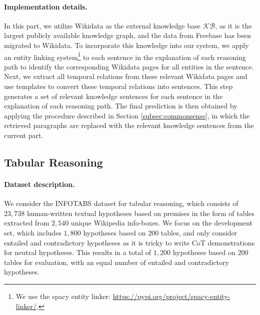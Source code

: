 \paragraph{Implementation details.} In this part, we utilize Wikidata \cite{vrandevcic2014wikidata} as the external knowledge base $\mathcal{KB}$, as it is the largest publicly available knowledge graph, and the data from Freebase has been migrated to Wikidata. To incorporate this knowledge into our system, we apply an entity linking system\footnote{We use the spacy entity linker: \url{https://pypi.org/project/spacy-entity-linker/}. } to each sentence in the explanation of each reasoning path to identify the corresponding Wikidata pages for all entities in the sentence. Next, we extract all temporal relations from these relevant Wikidata pages and use templates to convert these temporal relations into sentences. This step generates a set of relevant knowledge sentences for each sentence in the explanation of each reasoning path. The final prediction is then obtained by applying the procedure described in Section \ref{subsec:commonsense}, in which the retrieved paragraphs are replaced with the relevant knowledge sentences from the current part.

\subsection{Tabular Reasoning}
\label{subsec:tabular}

\paragraph{Dataset description.} We consider the \textsc{INFOTABS} dataset \cite{gupta2020infotabs} for tabular reasoning, which consists of $23,738$ human-written textual hypotheses based on premises in the form of tables extracted from $2,540$ unique Wikipedia info-boxes. We focus on the development set, which includes $1,800$ hypotheses based on $200$ tables, and only consider entailed and contradictory hypotheses as it is tricky to write CoT demonstrations for neutral hypotheses. This results in a total of $1,200$ hypotheses based on $200$ tables for evaluation, with an equal number of entailed and contradictory hypotheses.

